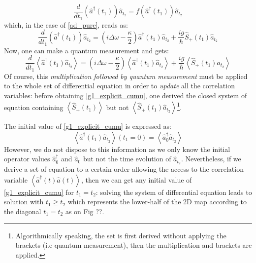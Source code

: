 \documentclass[11pt]{report}
\begin{document}
\begin{equation}
\frac{d}{dt_1} \left(\hat{a}^\dagger(t_1)\right) \hat{a}_{t_2} = f(\hat{a}^\dagger(t_1)) \hat{a}_{t_2}
\end{equation}
which, in the case of \eqref{ad_pure}, reads as:
\begin{equation}
\frac{d}{dt_1}\left(\hat{a}^\dagger(t_1)\right)\hat{a}_{t_2} = \left(i\Delta\omega - \frac{\kappa}{2} \right) \hat{a}^\dagger(t_1)\hat{a}_{t_2} + \frac{ig}{\hbar} \hat{S}_+(t_1)\hat{a}_{t_2}
\end{equation}
Now, one can make a quantum measurement and gets:
\begin{equation}
\label{g1_explicit_cumu}
\frac{d}{dt_1}\left\langle\hat{a}^\dagger(t_1)\hat{a}_{t_2}\right\rangle = \left(i\Delta\omega - \frac{\kappa}{2} \right) \left\langle\hat{a}^\dagger(t_1)\hat{a}_{t_2}\right\rangle + \frac{ig}{\hbar} \left\langle\hat{S}_+(t_1)\hat{a}_{t_2}\right\rangle
\end{equation}
Of course, this \textit{multiplication followed by quantum measurement} must be applied to the whole set of differential equation in order to \textit{update} all the correlation variables: before obtaining \eqref{g1_explicit_cumu}, one derived the closed system of equation containing $\left\langle\hat{S}_+(t_1)\right\rangle$ but not $\left\langle\hat{S}_+(t_1)\hat{a}_{t_2}\right\rangle$\footnote{Algorithmically speaking, the set is first derived without applying the brackets (i.e quantum measurement), then the multiplication and brackets are applied.}.

The initial value of \eqref{g1_explicit_cumu} is expressed as:
\begin{equation}
\left\langle\hat{a}^\dagger(t_1)\hat{a}_{t_2}\right\rangle (t_1=0) = \left\langle\hat{a}^\dagger_0\hat{a}_{t_2}\right\rangle
\end{equation}
However, we do not dispose to this information as we only know the initial operator values $\hat{a}^\dagger_0$ and $\hat{a}_0$ but not the time evolution of $\hat{a}_{t_2}$. Nevertheless, if we derive a set of equation to a certain order allowing the access to the correlation variable $\left\langle\hat{a}^\dagger(t)\hat{a}(t)\right\rangle$, then we can get any initial value of \eqref{g1_explicit_cumu} for $t_1=t_2$: solving the system of differential equation leads to solution with $t_1\geqslant t_2$ which represents the lower-half of the 2D map according to the diagonal $t_1=t_2$ as on Fig ??.
\end{document}
